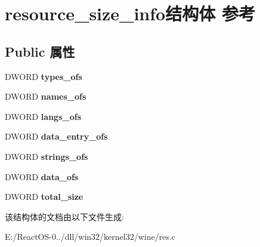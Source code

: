 \hypertarget{structresource__size__info}{}\section{resource\+\_\+size\+\_\+info结构体 参考}
\label{structresource__size__info}
\subsection*{Public 属性}
\begin{DoxyCompactItemize}
\item 
\mbox{\label{structresource__size__info_af7cfba1558baddf36b4ee0a3b4c4a740}} 
D\+W\+O\+RD {\bfseries types\+\_\+ofs}
\item 
\mbox{\label{structresource__size__info_a75ab8ec784ca493d0fd3b3aca33c4c69}} 
D\+W\+O\+RD {\bfseries names\+\_\+ofs}
\item 
\mbox{\label{structresource__size__info_ac9412a3b5e9dd111f594ee791fdbf8e0}} 
D\+W\+O\+RD {\bfseries langs\+\_\+ofs}
\item 
\mbox{\label{structresource__size__info_a235a8574412e2f8b8f3e2df114031a33}} 
D\+W\+O\+RD {\bfseries data\+\_\+entry\+\_\+ofs}
\item 
\mbox{\label{structresource__size__info_a76dc9d62b164b20f3e575756db2c71dd}} 
D\+W\+O\+RD {\bfseries strings\+\_\+ofs}
\item 
\mbox{\label{structresource__size__info_a1c2d4a8c11398d0b1315a0cdcf0240c4}} 
D\+W\+O\+RD {\bfseries data\+\_\+ofs}
\item 
\mbox{\label{structresource__size__info_a4585b34f0f2d173b5b21b8b2622fbc85}} 
D\+W\+O\+RD {\bfseries total\+\_\+size}
\end{DoxyCompactItemize}


该结构体的文档由以下文件生成\+:\begin{DoxyCompactItemize}
\item 
E\+:/\+React\+O\+S-\/0../dll/win32/kernel32/wine/res.\+c\end{DoxyCompactItemize}
